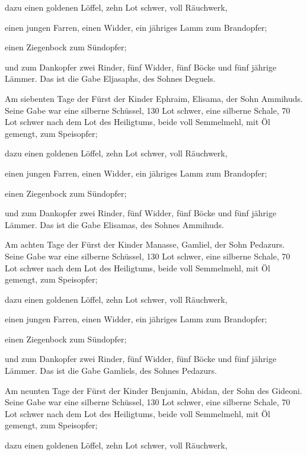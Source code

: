  dazu einen goldenen Löffel, zehn Lot schwer, voll
Räuchwerk,

 einen jungen Farren, einen Widder, ein jähriges Lamm zum
Brandopfer;

 einen Ziegenbock zum Sündopfer;

 und zum Dankopfer zwei Rinder, fünf Widder, fünf Böcke
und fünf jährige Lämmer. Das ist die Gabe Eljasaphs, des Sohnes Deguels.

 Am siebenten Tage der Fürst der Kinder Ephraim, Elisama,
der Sohn Ammihuds.  Seine Gabe war eine silberne
Schüssel, 130 Lot schwer, eine silberne Schale, 70 Lot schwer nach dem
Lot des Heiligtums, beide voll Semmelmehl, mit Öl gemengt, zum
Speisopfer;

 dazu einen goldenen Löffel, zehn Lot schwer, voll
Räuchwerk,

 einen jungen Farren, einen Widder, ein jähriges Lamm zum
Brandopfer;

 einen Ziegenbock zum Sündopfer;

 und zum Dankopfer zwei Rinder, fünf Widder, fünf Böcke
und fünf jährige Lämmer. Das ist die Gabe Elisamas, des Sohnes Ammihuds.

 Am achten Tage der Fürst der Kinder Manasse, Gamliel,
der Sohn Pedazurs.  Seine Gabe war eine silberne
Schüssel, 130 Lot schwer, eine silberne Schale, 70 Lot schwer nach dem
Lot des Heiligtums, beide voll Semmelmehl, mit Öl gemengt, zum
Speisopfer;

 dazu einen goldenen Löffel, zehn Lot schwer, voll
Räuchwerk,

 einen jungen Farren, einen Widder, ein jähriges Lamm zum
Brandopfer;

 einen Ziegenbock zum Sündopfer;

 und zum Dankopfer zwei Rinder, fünf Widder, fünf Böcke
und fünf jährige Lämmer. Das ist die Gabe Gamliels, des Sohnes Pedazurs.

 Am neunten Tage der Fürst der Kinder Benjamin, Abidan,
der Sohn des Gideoni.  Seine Gabe war eine silberne
Schüssel, 130 Lot schwer, eine silberne Schale, 70 Lot schwer nach dem
Lot des Heiligtums, beide voll Semmelmehl, mit Öl gemengt, zum
Speisopfer;

 dazu einen goldenen Löffel, zehn Lot schwer, voll
Räuchwerk,

